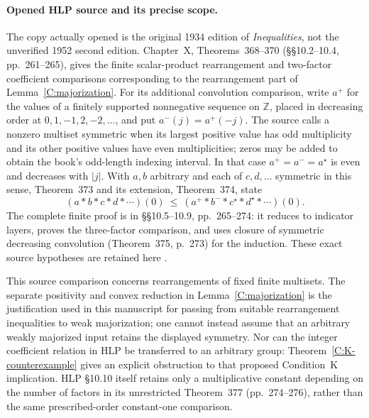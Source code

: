 \paragraph{Opened HLP source and its precise scope.}
The copy actually opened is the original 1934 edition of
\emph{Inequalities}, not the unverified 1952 second edition.
Chapter~X, Theorems~368--370 (\S\S10.2--10.4, pp.~261--265),
gives the finite scalar-product rearrangement and two-factor
coefficient comparisons corresponding to the rearrangement part of
Lemma~\ref{C:majorization}.  For its additional convolution comparison,
write \(a^+\) for the values of a finitely supported nonnegative
sequence on \(\mathbb Z\), placed in decreasing order at
\(0,1,-1,2,-2,\ldots\), and put \(a^-(j)=a^+(-j)\).
The source calls a nonzero multiset symmetric when its largest
positive value has odd multiplicity and its other positive values
have even multiplicities; zeros may be added to obtain the book's
odd-length indexing interval.  In that case \(a^+=a^-=a^\star\)
is even and decreases with \(|j|\).
With \(a,b\) arbitrary and each of \(c,d,\ldots\) symmetric in
this sense, Theorem~373 and its extension, Theorem~374, state
\[
 (a*b*c*d*\cdots)(0)
 \ \leq\
 (a^+*b^-*c^\star*d^\star*\cdots)(0).
\]
The complete finite proof is in \S\S10.5--10.9, pp.~265--274:
it reduces to indicator layers, proves the three-factor comparison,
and uses closure of symmetric decreasing convolution
(Theorem~375, p.~273) for the induction.
These exact source hypotheses are retained here
\cite[\S\S10.1--10.9, pp.~260--274]{C_HLP1934}.

This source comparison concerns rearrangements of fixed finite
multisets.  The separate positivity and convex reduction in
Lemma~\ref{C:majorization} is the justification used in this
manuscript for passing from suitable rearrangement inequalities to
weak majorization; one cannot instead assume that an arbitrary
weakly majorized input retains the displayed symmetry.
Nor can the integer coefficient relation in HLP be transferred
to an arbitrary group: Theorem~\ref{C:K-counterexample} gives an
explicit obstruction to that proposed Condition~K implication.
HLP \S10.10 itself retains only a multiplicative constant depending
on the number of factors in its unrestricted Theorem~377
(pp.~274--276), rather than the same prescribed-order
constant-one comparison.

